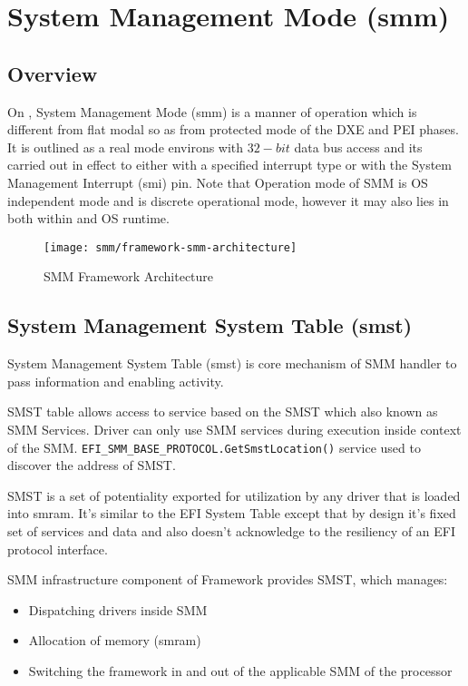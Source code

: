 \section{System Management Mode (\gls{smm})}\label{section-smm}
\subsection{Overview}
On , System Management Mode (\gls{smm}) is a manner of operation which is different from flat modal so as from protected mode of the DXE and PEI phases. It is outlined as a real mode environs with $ 32-bit $ data bus access and its carried out in effect to either with a specified interrupt type or with the System Management Interrupt (\gls{smi}) pin. Note that Operation mode of SMM is OS independent mode and is discrete operational mode, however it may also lies in both within and OS runtime.

\begin{figure}[!htbp]
	\centering
	\texttt{[image: smm/framework-smm-architecture]}
	\caption{SMM Framework Architecture \cite{beyond-bios}}\label{fig:framework-smm-architecture}
\end{figure}


\subsection{System Management System Table (\gls{smst})}
System Management System Table (\gls{smst}) is core mechanism of SMM handler to pass information and enabling activity.

SMST table allows access to service based on the SMST which also known as SMM Services. Driver can only use SMM services during execution inside context of the SMM. \verb|EFI_SMM_BASE_PROTOCOL.GetSmstLocation()| service used to discover the address of SMST.

SMST is a set of potentiality exported for utilization by any driver that is loaded into \gls{smram}. It's similar to the EFI System Table except that by design it's fixed set of services and data and also doesn't acknowledge to the resiliency of an EFI protocol interface.

SMM infrastructure component of Framework provides SMST, which manages:
\begin{itemize}
	\item Dispatching drivers inside SMM
	\item Allocation of memory (\gls{smram})
	\item Switching the framework in and out of the applicable SMM of the processor
\end{itemize}


